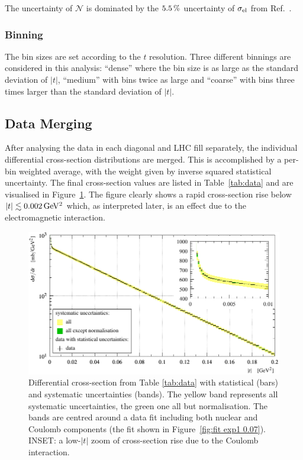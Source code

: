 The uncertainty of $\mathcal{N}$ is dominated by the $5.5\,{\rm \%}$ uncertainty of $\sigma_{\rm el}$ from Ref.~\cite{totem-13tev-90m}.



\subsubsection{Binning}
\label{sec:binning}

The bin sizes are set according to the $t$ resolution. Three different binnings are considered in this analysis: ``dense'' where the bin size is as large as the standard deviation of $|t|$, ``medium'' with bins twice as large and ``coarse'' with bins three times larger than the standard deviation of $|t|$.




\subsection{Data Merging}
\label{sec:data merging}

After analysing the data in each diagonal and LHC fill separately, the individual differential cross-section distributions are merged. This is accomplished by a per-bin weighted average, with the weight given by inverse squared statistical uncertainty. The final cross-section values are listed in Table~\ref{tab:data} and are visualised in Figure~\ref{fig:dsdt}. The figure clearly shows a rapid cross-section rise below $|t| \lesssim 0.002\,{\rm GeV^2}$ which, as interpreted later, is an effect due to the electromagnetic interaction.

\begin{figure}
\vskip-5mm
\begin{center}
\includegraphics{fig/t_dist_merged_with_unc.pdf}
\caption{%
Differential cross-section from Table \ref{tab:data} with statistical (bars) and systematic uncertainties (bands). The yellow band represents all systematic uncertainties, the green one all but normalisation. The bands are centred around a data fit including both nuclear and Coulomb components (the fit shown in Figure~\ref{fig:fit exp1 0.07}). INSET: a low-$|t|$ zoom of cross-section rise due to the Coulomb interaction.
}
\label{fig:dsdt}
\end{center}
\end{figure}


